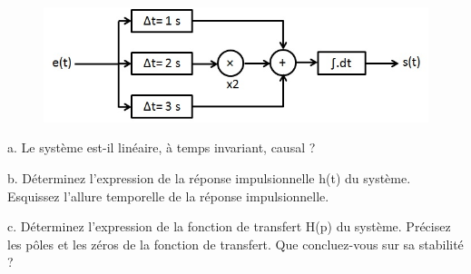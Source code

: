 	\begin{figure}[h!]
		\centering
		\includegraphics[scale=0.5]{images/Exo_2_6.jpg} 
	\end{figure}
	
	a. Le système est-il linéaire, à temps invariant, causal ?
	
	b. Déterminez l'expression de la réponse impulsionnelle h(t) du système. Esquissez l'allure temporelle de la réponse impulsionnelle. 
	
	c. Déterminez l'expression de la fonction de transfert H(p) du système. Précisez les pôles et les zéros de la fonction de transfert. Que concluez-vous sur sa stabilité ?
	



	